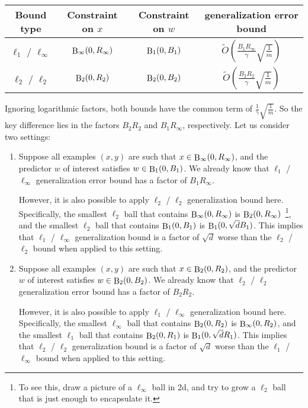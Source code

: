 \documentclass{article}
\DeclareMathOperator*{\B}{{\rm B}}
\begin{document}
\begin{table}[H]
\centering
\begin{tabular}{|c|c|c|c|}
\hline
Bound type & Constraint on $x$ & Constraint on $w$ & generalization error bound \\
\hline
$\ell_1$ / $\ell_\infty$ & $\B_\infty(0, R_\infty)$ & $\B_1(0, B_1)$ & $\tilde{O}(\frac{B_1 R_\infty}{\gamma} \sqrt{\frac{1}{m}})$ \\
$\ell_2$ / $\ell_2$ & $\B_2(0, R_2)$ & $\B_2(0, B_2)$ & $\tilde{O}(\frac{B_2 R_2}{\gamma} \sqrt{\frac{1}{m}})$ \\
\hline
\end{tabular}
\end{table}
Ignoring logarithmic factors, both bounds have the common term of $\frac{1}{\gamma}\sqrt{\frac{1}{m}}$. So the key difference lies in the factors $B_2 R_2$ and $B_1 R_\infty$, respectively. Let us consider two settings:
\begin{enumerate}
\item Suppose all examples $(x,y)$ are such that $x \in \B_{\infty}(0, R_\infty)$, and the predictor $w$ of interest satisfies $w \in \B_1(0, B_1)$. We already know that $\ell_1$ / $\ell_\infty$ generalization error bound has a factor of $B_1 R_\infty$.

However, it is also possible to apply $\ell_2$ / $\ell_2$ generalization bound here.
Specifically, the smallest $\ell_2$ ball that contains $\B_{\infty}(0, R_\infty)$ is $\B_2(0,R_\infty)$~\footnote{To see this, draw a picture of a $\ell_\infty$ ball in 2d, and try to grow a $\ell_2$ ball that is just enough to encapsulate it.}, and the smallest $\ell_2$ ball that contains $\B_{1}(0, B_1)$ is $\B_1(0,\sqrt{d} B_1)$. This implies that
$\ell_1$ / $\ell_\infty$ generalization bound is a factor of $\sqrt{d}$ worse than the $\ell_2$ / $\ell_2$ bound when applied to this setting.

\item Suppose all examples $(x,y)$ are such that $x \in \B_{2}(0, R_2)$, and the predictor $w$ of interest satisfies $w \in \B_2(0, B_2)$. We already know that $\ell_2$ / $\ell_2$ generalization error bound has a factor of $B_2 R_2$.

However, it is also possible to apply $\ell_1$ / $\ell_\infty$ generalization bound here.
Specifically, the smallest $\ell_\infty$ ball that contains $\B_{2}(0, R_2)$ is $\B_\infty(0,R_2)$, and the smallest $\ell_1$ ball that contains $\B_{2}(0, R_1)$ is $\B_1(0,\sqrt{d} R_1)$.
This implies that $\ell_2$ / $\ell_2$ generalization bound is a factor of $\sqrt{d}$ worse than the $\ell_1$ / $\ell_\infty$ bound when applied to this setting.
\end{enumerate}
\end{document}
